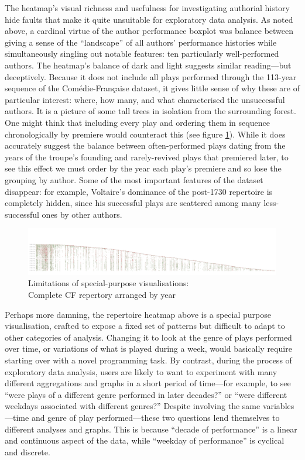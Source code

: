 \documentclass[	DIV=calc,%
							paper=a4,%
							fontsize=11pt,%
							twocolumn]{scrartcl}	 					%
\begin{document}
The heatmap’s visual richness and usefulness for investigating authorial history hide faults that make it quite unsuitable for exploratory data analysis.  As noted above, a cardinal virtue of the author performance boxplot was balance between giving a sense of the ``landscape'' of all authors’ performance histories while simultaneously singling out notable features: ten particularly well-performed authors.  The heatmap’s balance of dark and light suggests similar reading—but deceptively.  Because it does not include all plays performed through the 113-year sequence of the Comédie-Française dataset, it gives little sense of why these are of particular interest: where, how many, and what characterised the unsuccessful authors.  It is a picture of some tall trees in isolation from the surrounding forest.  One might think that including every play and ordering them in sequence chronologically by premiere would counteract this (see figure \ref{fig:heatmap_all}).  While it does accurately suggest the balance between often-performed plays dating from the years of the troupe’s founding and rarely-revived plays that premiered later, to see this effect we must order by the year each play’s premiere and so lose the grouping by author.  Some of the most important features of the dataset disappear: for example, Voltaire’s dominance of the post-1730 repertoire is completely hidden, since his successful plays are scattered among many less-successful ones by other authors.

\begin{figure}
  \centering
	\includegraphics[width=9in,angle=270]{viz/repertoire_by_season_all.pdf}
	\caption{Limitations of special-purpose visualisations: \\ Complete CF repertory arranged by year}
  \label{fig:heatmap_all}
\end{figure}

Perhaps more damning, the repertoire heatmap above is a special purpose visualisation, crafted to expose a fixed set of patterns but difficult to adapt to other categories of analysis.  Changing it to look at the genre of plays performed over time, or variations of what is played during a week, would basically require starting over with a novel programming task.  By contrast, during the process of exploratory data analysis, users are likely to want to experiment with many different aggregations and graphs in a short period of time—for example, to see ``were plays of a different genre performed in later decades?'' or ``were different weekdays associated with different genres?''  Despite involving the same variables—time and genre of play performed—these two questions lend themselves to different analyses and graphs.  This is because ``decade of performance'' is a linear and continuous aspect of the data, while ``weekday of performance'' is cyclical and discrete.
\end{document}
